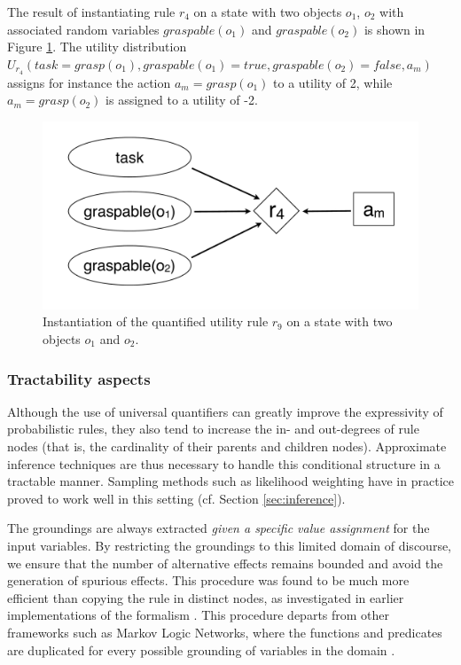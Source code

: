 The result of instantiating rule $r_4$ on a state with two objects $o_1$, $o_2$ with associated random variables $\mathit{graspable}(o_1)$ and $\mathit{graspable}(o_2)$ is shown in Figure  \ref{fig:quantinstantitionutil}.  The utility distribution $U_{r_4}(\mathit{task}\!=\!\mathit{grasp}(o_1), \mathit{graspable}(o_1) \!=\!\mathit{true}, \mathit{graspable}(o_2)\!=\!\mathit{false}, a_m)$ assigns for instance the action $a_m\!=\!\mathit{grasp}(o_1)$ to a utility of 2, while $a_m\!=\!\mathit{grasp(o_2)}$ is assigned to a utility of -2. 


\begin{figure}[h]
\centering
\includegraphics[scale=0.25]{imgs/quantutilruleinstantiation.pdf}
\caption{Instantiation of the quantified utility rule $r_9$ on a state with two objects $o_1$ and $o_2$.}
\label{fig:quantinstantitionutil}
\end{figure}

\subsubsection*{Tractability aspects}

Although the use of universal quantifiers can greatly improve the expressivity of probabilistic rules, they also tend to increase the in- and out-degrees of rule nodes (that is, the cardinality of their parents and children nodes). Approximate inference techniques are thus necessary to handle this conditional structure in a tractable manner. Sampling methods such as likelihood weighting have in practice proved to work well in this setting (cf. Section \ref{sec:inference}).

The groundings are always extracted \textit{given a specific value assignment} for the input variables. By restricting the groundings to this limited domain of discourse, we ensure that the number of alternative effects remains bounded and avoid the generation of spurious effects.   This procedure was found to be much more efficient than copying the rule in distinct nodes, as investigated in earlier implementations of the formalism \citep{relational-apl2012}.  This procedure departs from other frameworks such as Markov Logic Networks, where the functions and predicates are duplicated for every possible grounding of variables in the domain \citep{Richardson:2006}.


